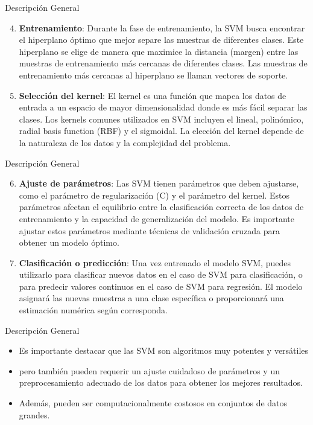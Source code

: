 \documentclass[11pt,aspectratio=169]{beamer}
\begin{document}
\begin{frame}{Descripción General}
	\begin{enumerate}
		\setcounter{enumi}{3}
		\item \textbf{Entrenamiento}: Durante la fase de entrenamiento, la SVM busca encontrar el hiperplano óptimo que mejor 
			separe las muestras de diferentes clases. Este hiperplano se elige de manera que maximice la distancia (margen) 
			entre las muestras de entrenamiento más cercanas de diferentes clases. Las muestras de entrenamiento más cercanas 
			al hiperplano se llaman vectores de soporte.\pause
		\item \textbf{Selección del kernel}: El kernel es una función que mapea los datos de entrada a un espacio de mayor 
			dimensionalidad donde es más fácil separar las clases. Los kernels comunes utilizados en SVM incluyen el lineal, 
			polinómico, radial basis function (RBF) y el sigmoidal. La elección del kernel depende de la naturaleza de los datos 
			y la complejidad del problema.
	\end{enumerate}
\end{frame}

\begin{frame}{Descripción General}
	\begin{enumerate}
		\setcounter{enumi}{5}
		\item \textbf{Ajuste de parámetros}: Las SVM tienen parámetros que deben ajustarse, como el parámetro de regularización 
			(C) y el parámetro del kernel. Estos parámetros afectan el equilibrio entre la clasificación correcta de los datos 
			de entrenamiento y la capacidad de generalización del modelo. Es importante ajustar estos parámetros mediante técnicas 
			de validación cruzada para obtener un modelo óptimo. \pause
		\item \textbf{Clasificación o predicción}: Una vez entrenado el modelo SVM, puedes utilizarlo para clasificar nuevos datos 
			en el caso de SVM para clasificación, o para predecir valores continuos en el caso de SVM para regresión. El modelo 
			asignará las nuevas muestras a una clase específica o proporcionará una estimación numérica según corresponda.
	\end{enumerate}
\end{frame}

\begin{frame}{Descripción General}
	\begin{itemize}
		\item Es importante destacar que las SVM son algoritmos muy potentes y versátiles \pause 
		\item pero también pueden requerir un ajuste cuidadoso de parámetros y un preprocesamiento adecuado de los datos 
			para obtener los mejores resultados.\pause 
		\item Además, pueden ser computacionalmente costosos en conjuntos de datos grandes.
	\end{itemize}
\end{frame}
\end{document}
